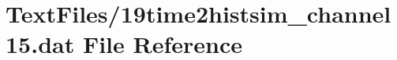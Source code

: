 \hypertarget{19time2histsim__channel15_8dat}{}\section{Text\+Files/19time2histsim\+\_\+channel15.dat File Reference}
\label{19time2histsim__channel15_8dat}
